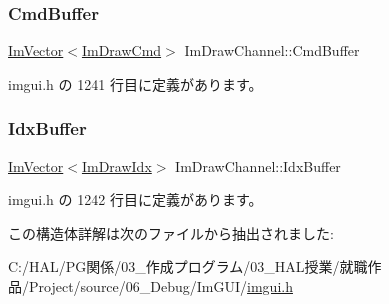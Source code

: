 \subsubsection{\texorpdfstring{Cmd\+Buffer}{CmdBuffer}}
{\footnotesize\ttfamily \mbox{\hyperlink{class_im_vector}{Im\+Vector}}$<$\mbox{\hyperlink{struct_im_draw_cmd}{Im\+Draw\+Cmd}}$>$ Im\+Draw\+Channel\+::\+Cmd\+Buffer}



 imgui.\+h の 1241 行目に定義があります。

\mbox{\label{struct_im_draw_channel_a7fbed7d3523124fadd94859d5ac0fd67}} 
\subsubsection{\texorpdfstring{Idx\+Buffer}{IdxBuffer}}
{\footnotesize\ttfamily \mbox{\hyperlink{class_im_vector}{Im\+Vector}}$<$\mbox{\hyperlink{imgui_8h_afdc8744a5ac1a968b1ddfa47e13b2fa1}{Im\+Draw\+Idx}}$>$ Im\+Draw\+Channel\+::\+Idx\+Buffer}



 imgui.\+h の 1242 行目に定義があります。



この構造体詳解は次のファイルから抽出されました\+:\begin{DoxyCompactItemize}
\item 
C\+:/\+H\+A\+L/\+P\+G関係/03\+\_\+作成プログラム/03\+\_\+\+H\+A\+L授業/就職作品/\+Project/source/06\+\_\+\+Debug/\+Im\+G\+U\+I/\mbox{\hyperlink{imgui_8h}{imgui.\+h}}\end{DoxyCompactItemize}
